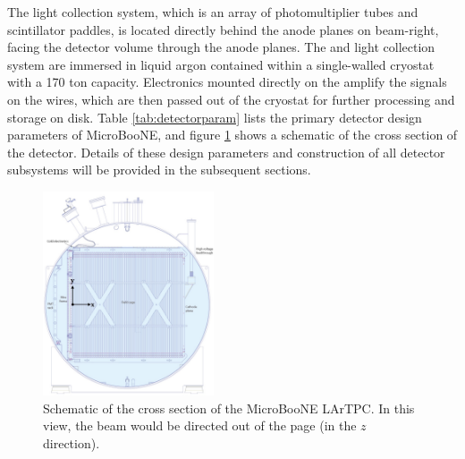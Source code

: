 The light collection system, which is an array of photomultiplier tubes and scintillator paddles, is located directly behind the anode planes on beam-right, facing the detector volume through the anode planes.  The \lartpc and light collection system are immersed in liquid argon contained within a single-walled cryostat with a 170 ton capacity.  Electronics mounted directly on the \lartpc amplify the signals on the wires, which are then passed out of the cryostat for further processing and storage on disk.  Table \ref{tab:detectorparam} lists the primary detector design parameters of MicroBooNE, and figure \ref{fig:microboonetpc} shows a schematic of the cross section of the detector. Details of these design parameters and construction of all detector subsystems will be provided in the subsequent sections.

\begin{figure}
\centering 
\includegraphics[width=0.45\textwidth]{figures/microboone_tpc_diagram.jpg}
\caption{Schematic of the cross section of the MicroBooNE LArTPC.  In this view, the beam would be directed out of the page (in the $z$ direction).}
\label{fig:microboonetpc}
\end{figure}




